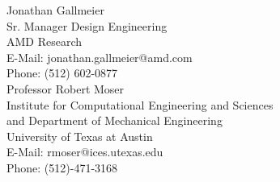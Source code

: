 


\noindent Jonathan Gallmeier \\
Sr. Manager Design Engineering \\
AMD Research \\
E-Mail: jonathan.gallmeier@amd.com \\
Phone: (512) 602-0877 \\
\newline
\newline
\noindent Professor Robert Moser \\
Institute for Computational Engineering and Sciences \\
and Department of Mechanical Engineering \\
University of Texas at Austin \\
E-Mail: rmoser@ices.utexas.edu \\
\noindent Phone: (512)-471-3168 
